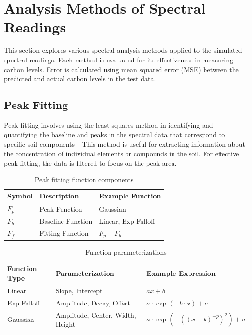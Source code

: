 \documentclass[review]{elsarticle}
\begin{document}
\section{Analysis Methods of Spectral Readings}

This section explores various spectral analysis methods applied to the simulated spectral readings. Each method is evaluated for its effectiveness in measuring carbon levels. Error is calculated using mean squared error (MSE) between the predicted and actual carbon levels in the test data.

\subsection{Peak Fitting}

Peak fitting involves using the least-squares method in identifying and quantifying the baseline and peaks in the spectral data that correspond to specific soil components~\cite{gardner_use_2011}. This method is useful for extracting information about the concentration of individual elements or compounds in the soil. For effective peak fitting, the data is filtered to focus on the peak area.

\begin{table}[H]
\centering
\caption{Peak fitting function components}
\label{tab:peak_functions}
\begin{tabular}{@{}lll@{}}
\toprule
Symbol & Description & Example Function \\
\midrule
$F_p$ & Peak Function & Gaussian \\
$F_b$ & Baseline Function & Linear, Exp Falloff \\
$F_f$ & Fitting Function & $F_p + F_b$ \\
\bottomrule
\end{tabular}
\end{table}

\begin{table}[H]
\centering
\caption{Function parameterizations}
\label{tab:function_params}
\begin{tabular}{@{}lll@{}}
\toprule
Function Type & Parameterization & Example Expression \\
\midrule
Linear & Slope, Intercept & $ax + b$ \\
Exp Falloff & Amplitude, Decay, Offset & $a \cdot \exp(-b \cdot x) + c$ \\
Gaussian & Amplitude, Center, Width, Height & $a \cdot \exp(-((x - b)^{-p})^2) + c$ \\
\bottomrule
\end{tabular}
\end{table}
\end{document}

